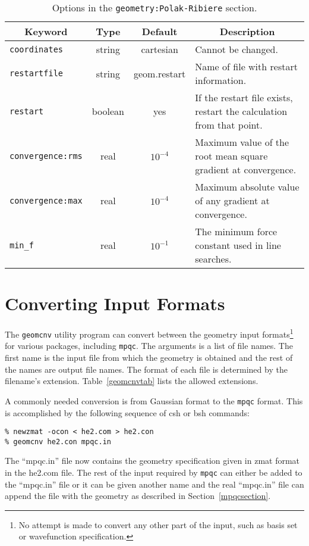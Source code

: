\begin{table}
\centering
\begin{tabular}{|lccp{2.75in}|}
\hline
\multicolumn{1}{|c}{Keyword} & \multicolumn{1}{c}{Type} &
  \multicolumn{1}{c}{Default} & \multicolumn{1}{c|}{Description} \\
\hline
{\tt coordinates} & string & cartesian & Cannot be changed. \\
{\tt restartfile} & string &geom.restart& Name of file with restart
                                          information.\\
{\tt restart}     & boolean& yes & If the restart file exists, restart
                                   the calculation from that point. \\
{\tt convergence:rms} & real & $10^{-4} $& Maximum value of the root mean
                                          square gradient at convergence. \\
{\tt convergence:max} & real & $10^{-4} $& Maximum absolute value of any
                                          gradient at convergence. \\
{\tt min\_f}           & real & $10^{-1} $& The minimum force constant used
                                           in line searches. \\
\hline
\end{tabular}
\caption{Options in the {\tt geometry:Polak-Ribiere} section.}
\label{polakribiere}
\end{table}

\section{Converting Input Formats}
The {\tt geomcnv} utility program can convert between the geometry
input formats\footnote
  {
  No attempt is made to convert any other part of the input, such as
  basis set or wavefunction specification.
  }
for various packages, including {\tt mpqc}.  The arguments is a list of file
names.  The first name is the input file from which the geometry is
obtained and the rest of the names are output file names.  The
format of each file is determined by the filename's extension.
Table~\ref{geomcnvtab} lists the allowed extensions.

A commonly needed conversion is from Gaussian format to the {\tt mpqc}
format.  This is accomplished by the following sequence of csh or bsh
commands:
\begin{verbatim}
% newzmat -ocon < he2.com > he2.con
% geomcnv he2.con mpqc.in
\end{verbatim}
The ``mpqc.in'' file now contains the geometry specification given
in zmat format in the he2.com file.  The rest of the input required
by {\tt mpqc} can either be added to the ``mpqc.in'' file or it can
be given another name and the real ``mpqc.in'' file can append
the file with the geometry as described in Section~\ref{mpqcsection}.

